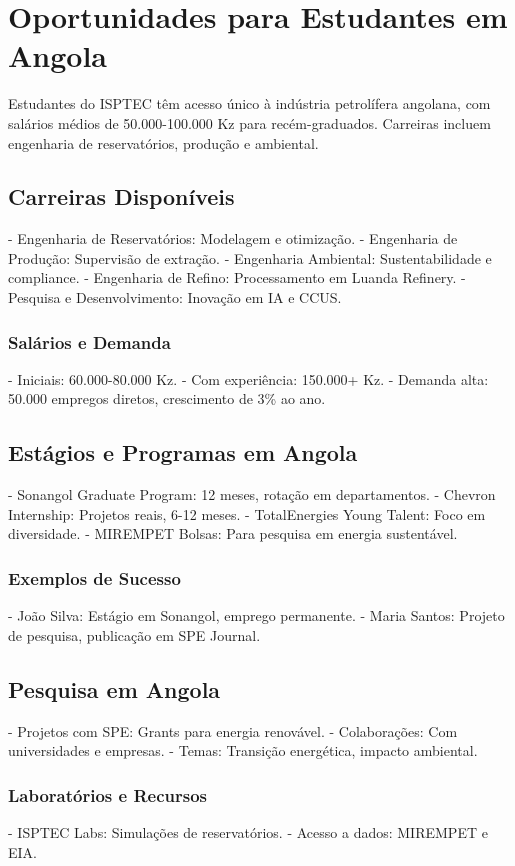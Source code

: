 \documentclass[12pt]{article}
\begin{document}
\section{Oportunidades para Estudantes em Angola}

Estudantes do ISPTEC têm acesso único à indústria petrolífera angolana, com salários médios de 50.000-100.000 Kz para recém-graduados. Carreiras incluem engenharia de reservatórios, produção e ambiental.

\subsection{Carreiras Disponíveis}
- Engenharia de Reservatórios: Modelagem e otimização.
- Engenharia de Produção: Supervisão de extração.
- Engenharia Ambiental: Sustentabilidade e compliance.
- Engenharia de Refino: Processamento em Luanda Refinery.
- Pesquisa e Desenvolvimento: Inovação em IA e CCUS.

\subsubsection{Salários e Demanda}
- Iniciais: 60.000-80.000 Kz.
- Com experiência: 150.000+ Kz.
- Demanda alta: 50.000 empregos diretos, crescimento de 3\% ao ano.

\subsection{Estágios e Programas em Angola}
- Sonangol Graduate Program: 12 meses, rotação em departamentos.
- Chevron Internship: Projetos reais, 6-12 meses.
- TotalEnergies Young Talent: Foco em diversidade.
- MIREMPET Bolsas: Para pesquisa em energia sustentável.

\subsubsection{Exemplos de Sucesso}
- João Silva: Estágio em Sonangol, emprego permanente.
- Maria Santos: Projeto de pesquisa, publicação em SPE Journal.

\subsection{Pesquisa em Angola}
- Projetos com SPE: Grants para energia renovável.
- Colaborações: Com universidades e empresas.
- Temas: Transição energética, impacto ambiental.

\subsubsection{Laboratórios e Recursos}
- ISPTEC Labs: Simulações de reservatórios.
- Acesso a dados: MIREMPET e EIA.
\end{document}
